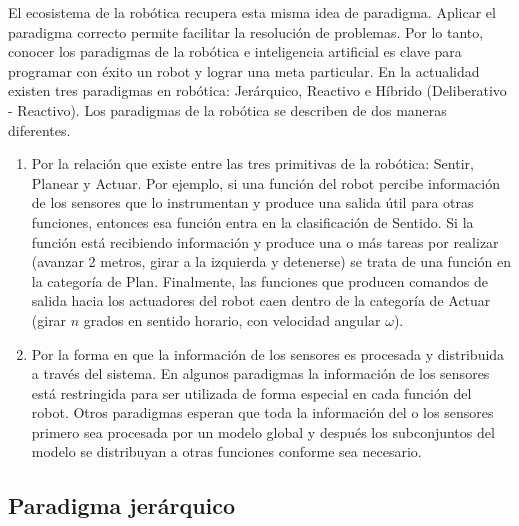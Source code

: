 El ecosistema de la robótica recupera esta misma idea de paradigma. Aplicar el paradigma correcto permite facilitar la resolución de problemas. Por lo tanto, conocer los paradigmas de la robótica e inteligencia artificial es clave para programar con éxito un robot y lograr una meta particular. En la actualidad existen tres paradigmas en robótica: Jerárquico, Reactivo e Híbrido (Deliberativo - Reactivo). Los paradigmas de la robótica se describen de dos maneras diferentes.

\begin{enumerate}
    \item Por la relación que existe entre las tres primitivas de la robótica: Sentir, Planear y Actuar. Por ejemplo, si una función del robot percibe información de los sensores que lo instrumentan y produce una salida útil para otras funciones, entonces esa función entra en la clasificación de Sentido. Si la función está recibiendo información y produce una o más tareas por realizar (avanzar 2 metros, girar a la izquierda y detenerse) se trata de una función en la categoría de Plan. Finalmente, las funciones que producen comandos de salida hacia los actuadores del robot caen dentro de la categoría de Actuar (girar $n$ grados en sentido horario, con velocidad angular $\omega$).
    
    \item Por la forma en que la información de los sensores es procesada y distribuida a través del sistema. En algunos paradigmas la información de los sensores está restringida para ser utilizada de forma especial en cada función del robot. Otros paradigmas esperan que toda la información del o los sensores primero sea procesada por un modelo global y después los subconjuntos del modelo se distribuyan a otras funciones conforme sea necesario.
\end{enumerate}

\subsection{Paradigma jerárquico} \label{sub:paradigma_jerárquico}

